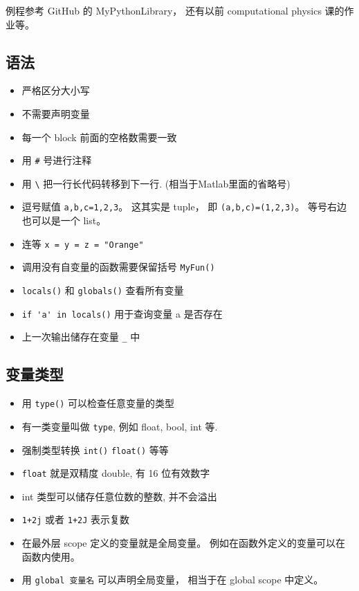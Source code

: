 
\begin{issues}
\issueDraft
\end{issues}

例程参考 GitHub 的 MyPythonLibrary， 还有以前 computational physics 课的作业等。

\subsection{语法}
\begin{itemize}
\item 严格区分大小写
\item 不需要声明变量
\item 每一个 block 前面的空格数需要一致
\item 用 \verb|#| 号进行注释
\item 用 \verb|\| 把一行长代码转移到下一行. (相当于Matlab里面的省略号)
\item 逗号赋值 \verb`a,b,c=1,2,3`。 这其实是 tuple， 即 \verb|(a,b,c)=(1,2,3)|。 等号右边也可以是一个 list。
\item 连等 \verb|x = y = z = "Orange"|
\item 调用没有自变量的函数需要保留括号  \verb`MyFun()`
\item \verb`locals()` 和 \verb`globals()` 查看所有变量
\item \verb`if 'a' in locals()` 用于查询变量 a 是否存在
\item 上一次输出储存在变量 \verb`_` 中
\end{itemize}

\subsection{变量类型}
\begin{itemize}
\item 用 \verb`type()` 可以检查任意变量的类型
\item 有一类变量叫做 \verb`type`, 例如 float, bool, int 等.
\item 强制类型转换 \verb`int()` \verb`float()` 等等
\item \verb`float` 就是双精度 double, 有 16 位有效数字
\item int 类型可以储存任意位数的整数, 并不会溢出 
\item \verb`1+2j` 或者 \verb`1+2J` 表示复数
\item 在最外层 scope 定义的变量就是全局变量。 例如在函数外定义的变量可以在函数内使用。
\item 用 \verb|global 变量名| 可以声明全局变量， 相当于在 global scope 中定义。
\end{itemize}

